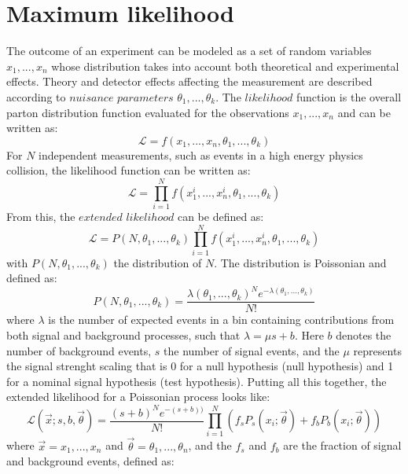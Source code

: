 \section{Maximum likelihood}
\noindent
\justify
The outcome of an experiment can be modeled as a set of random variables $x_{1}, ..., x_{n}$ whose distribution takes into account both theoretical and experimental effects. 
Theory and detector effects affecting the measurement are described according to $nuisance$ $parameters$ $\theta_{1}, ..., \theta_{k}$.
The $likelihood$ function is the overall parton distribution function evaluated for the observations $x_{1}, ..., x_{n}$ and can be written as:
\begin{equation}
\mathcal{L}=f(x_{1}, ..., x_{n}, \theta_{1}, ..., \theta_{k})
\end{equation}
For $N$ independent measurements, such as events in a high energy physics collision, the likelihood function can be written as: 
\begin{equation}
\mathcal{L}=\prod_{i=1}^{N}f(x_{1}^{i}, ..., x_{n}^{i}, \theta_{1}, ..., \theta_{k})
\end{equation}
From this, the $extended$ $likelihood$ can be defined as:
\begin{equation}
\mathcal{L}=P(N, \theta_{1}, ..., \theta_{k})\prod_{i=1}^{N}f(x_{1}^{i}, ..., x_{n}^{i}, \theta_{1}, ..., \theta_{k})
\end{equation}
with $P(N, \theta_{1}, ..., \theta_{k})$ the distribution of $N$. 
The distribution is Poissonian and defined as:
\begin{equation}
P(N,\theta_{1}, ..., \theta_{k})=\frac{\lambda(\theta_{1}, ..., \theta_{k})^{N}e^{-\lambda(\theta_{1}, ..., \theta_{k})}}{N!}
\end{equation}
where $\lambda$ is the number of expected events in a bin containing contributions from both signal and background processes, such that $\lambda=\mu s+b$.  
Here $b$ denotes the number of background events, $s$ the number of signal events, and the $\mu$ represents the signal strenght scaling that is 0 for a null hypothesis (null hypothesis) and 1 for a nominal signal hypothesis (test hypothesis). 
Putting all this together, the extended likelihood for a Poissonian process looks like:
\begin{equation}
\mathcal{L}(\vec{x}; s, b, \vec{\theta})=\frac{(s+b)^{N}e^{-(s+b))}}{N!}\prod_{i=1}^{N}\left( f_{s}P_{s}(x_{i}; \vec{\theta})+f_{b}P_{b}(x_{i};\vec{\theta})\right)
\label{eq:maxLikelihood}
\end{equation}
where $\vec{x}=x_{1}, ..., x_{n}$ and $\vec{\theta}=\theta_{1}, ..., \theta_{n}$, and the $f_{s}$ and $f_{b}$ are the fraction of signal and background events, defined as:
